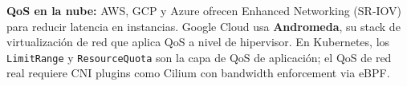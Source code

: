 \begin{moderno}
 \textbf{QoS en la nube:} AWS, GCP y Azure ofrecen Enhanced Networking
(SR-IOV) para reducir latencia en instancias. Google Cloud usa \textbf{Andromeda},
su stack de virtualización de red que aplica QoS a nivel de hipervisor. En Kubernetes,
los \texttt{LimitRange} y \texttt{ResourceQuota} son la capa de QoS de aplicación;
el QoS de red real requiere CNI plugins como Cilium con bandwidth enforcement via eBPF.
\end{moderno}
